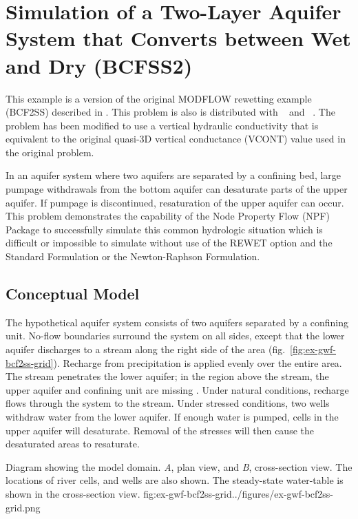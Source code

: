 \section{Simulation of a Two-Layer Aquifer System that Converts between Wet and Dry (BCFSS2)}

This example is a version of the original MODFLOW rewetting example (BCF2SS) described in \cite{mcdonaldetal1991wetdry}. This problem is also is distributed with \mff~\citep{modflow2005} and \mf~\citep{modflow6software}. The problem has been modified to use a vertical hydraulic conductivity that is equivalent to the original quasi-3D vertical conductance (VCONT) value used in the original problem.

In an aquifer system where two aquifers are separated by a confining bed, large pumpage withdrawals from the bottom aquifer can desaturate parts of the upper aquifer. If pumpage is discontinued, resaturation of the upper aquifer can occur. This problem demonstrates the capability of the Node Property Flow (NPF) Package to successfully simulate this common hydrologic situation which is difficult or impossible to simulate without use of the REWET option and the Standard Formulation or the Newton-Raphson Formulation.

\subsection{Conceptual Model}

The hypothetical aquifer system consists of two aquifers separated by a confining unit. No-flow boundaries surround the system on all sides, except that the lower aquifer discharges to a stream along the right side of the area (fig.~\ref{fig:ex-gwf-bcf2ss-grid}). Recharge from precipitation is applied evenly over the entire area. The stream penetrates the lower aquifer; in the region above the stream, the upper aquifer and confining unit are missing  \cite[see][figure~1]{mcdonaldetal1991wetdry}. Under natural conditions, recharge flows through the system to the stream. Under stressed conditions, two wells withdraw water from the lower aquifer. If enough water is pumped, cells in the upper aquifer will desaturate. Removal of the stresses will then cause the desaturated areas to resaturate.


\begin{StandardFigure}{
                                     Diagram showing the model domain. \textit{A}, plan view, and \textit{B}, cross-section 
                                     view. The locations of river cells, and wells are also shown. The steady-state water-table
                                     is shown in the cross-section view.
                                     }{fig:ex-gwf-bcf2ss-grid}{../figures/ex-gwf-bcf2ss-grid.png}
\end{StandardFigure}                                 

